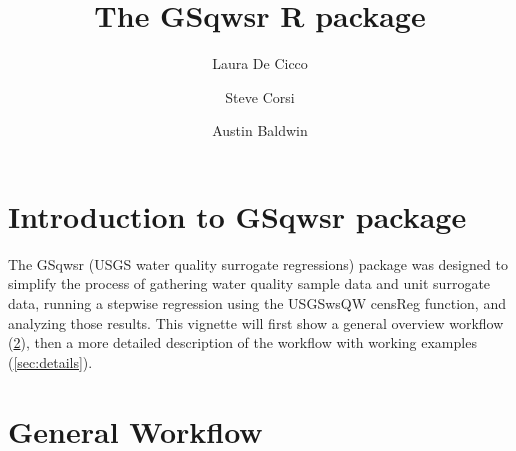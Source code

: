 \documentclass[a4paper,11pt]{article}\usepackage[]{graphicx}\usepackage[]{color}
\begin{document}
\title{The GSqwsr R package}
\author[1]{Laura De Cicco}
\author[1]{Steve Corsi}
\author[1]{Austin Baldwin}






\maketitle
\tableofcontents

\section{Introduction to GSqwsr package}
The GSqwsr (USGS water quality surrogate regressions) package was designed to simplify the process of gathering water quality sample data and unit surrogate data, running a stepwise regression using the USGSwsQW censReg function, and analyzing those results. This vignette will first show a general overview workflow  (\ref{sec:workflow}), then a more detailed description of the workflow with working examples (\ref{sec:details}).

\section{General Workflow}
\label{sec:workflow}
\end{document}
